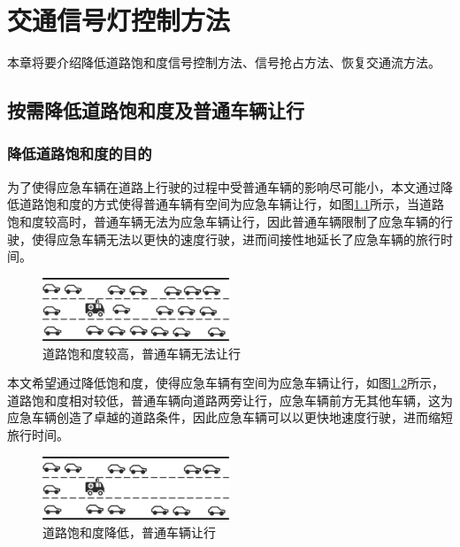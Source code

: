 
\chapter{交通信号灯控制方法}
\label{ch4}
本章将要介绍降低道路饱和度信号控制方法、信号抢占方法、恢复交通流方法。




\section{按需降低道路饱和度及普通车辆让行}
\subsection{降低道路饱和度的目的}
为了使得应急车辆在道路上行驶的过程中受普通车辆的影响尽可能小，本文通过降低道路饱和度的方式使得普通车辆有空间为应急车辆让行，如图\ref{fig:highsituration}所示，当道路饱和度较高时，普通车辆无法为应急车辆让行，因此普通车辆限制了应急车辆的行驶，使得应急车辆无法以更快的速度行驶，进而间接性地延长了应急车辆的旅行时间。
\begin{figure}[ht]
	\centering
	\includegraphics[width=0.5\textwidth]{figures/highsituration.png}
	\caption{道路饱和度较高，普通车辆无法让行}
	\label{fig:highsituration}
\end{figure}

本文希望通过降低饱和度，使得应急车辆有空间为应急车辆让行，如图\ref{fig:lowsituration}所示，道路饱和度相对较低，普通车辆向道路两旁让行，应急车辆前方无其他车辆，这为应急车辆创造了卓越的道路条件，因此应急车辆可以以更快地速度行驶，进而缩短旅行时间。

\begin{figure}[ht]
	\centering
	\includegraphics[width=0.5\textwidth]{figures/lowsituration.png}
	\caption{道路饱和度降低，普通车辆让行}
	\label{fig:lowsituration}
\end{figure}

